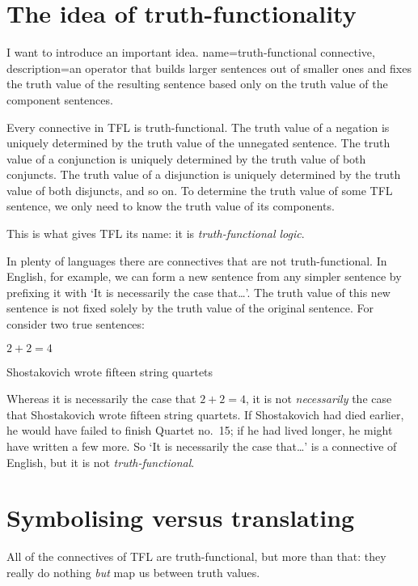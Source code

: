 \section{The idea of truth-functionality}
I want to introduce an important idea. 
{
name=truth-functional connective,
description={an operator that builds larger sentences out of smaller ones and fixes the truth value of the resulting sentence based only on the truth value of the component sentences.}
}
        
Every connective in TFL is truth-functional. The truth value of a negation is uniquely determined by the truth value of the unnegated sentence. The truth value of a conjunction is uniquely determined by the truth value of both conjuncts. The truth value of a disjunction is uniquely determined by the truth value of both disjuncts, and so on. To determine the truth value of some TFL sentence, we only need to know the truth value of its components. 

This is what gives TFL its name: it is \emph{truth-functional logic}.

In plenty of languages there are connectives that are not truth-functional. In English, for example, we can form a new sentence from any simpler sentence by prefixing it with `It is necessarily the case that\ldots'. The truth value of this new sentence is not fixed solely by the truth value of the original sentence. For consider two true sentences:
	\begin{earg}
		\item $2 + 2 = 4$
		\item Shostakovich wrote fifteen string quartets
	\end{earg}
Whereas it is necessarily the case that $2 + 2 = 4$, it is not \emph{necessarily} the case that Shostakovich wrote fifteen string quartets. If Shostakovich had died earlier, he would have failed to finish Quartet no.\ 15; if he had lived longer, he might have written a few more. So `It is necessarily the case that\ldots' is a connective of English, but it is not \emph{truth-functional}.


\section{Symbolising versus translating}
All of the connectives of TFL are truth-functional, but more than that: they really do nothing \emph{but} map us between truth values.  


